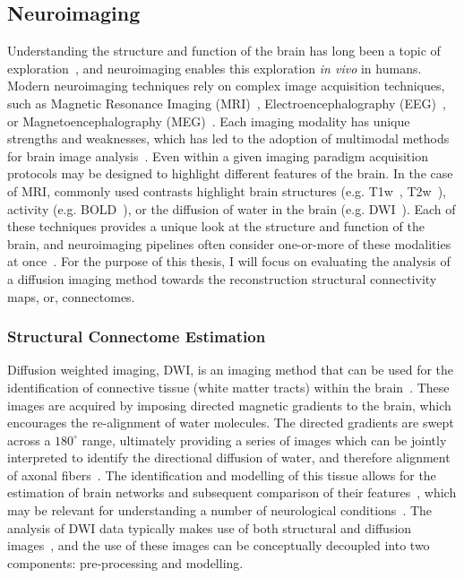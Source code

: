 \subsection{Neuroimaging}
Understanding the structure and function of the brain has long been a topic of exploration~\cite{raichle2006brain}, and
neuroimaging enables this exploration \textit{in vivo} in humans. Modern neuroimaging techniques rely on complex image
acquisition techniques, such as Magnetic Resonance Imaging (MRI)~\cite{young1987magnetic}, Electroencephalography
(EEG)~\cite{da2009eeg}, or Magnetoencephalography (MEG)~\cite{baillet2017magnetoencephalography}. Each imaging modality
has unique strengths and weaknesses, which has led to the adoption of multimodal methods for brain image
analysis~\cite{sui2012review,calhoun2006feature}. Even within a given imaging paradigm acquisition protocols may be
designed to highlight different features of the brain. In the case of MRI, commonly used contrasts highlight brain
structures (e.g. T1w~\cite{bergamino2014review}, T2w~\cite{chavhan2009principles}), activity (e.g.
BOLD~\cite{logothetis2004nature}), or the diffusion of water in the brain (e.g. DWI~\cite{bammer2003basic}). Each of
these techniques provides a unique look at the structure and function of the brain, and neuroimaging pipelines often
consider one-or-more of these modalities at once~\cite{esteban2019fmriprep,garyfallidis2014dipy}. For the purpose of
this thesis, I will focus on evaluating the analysis of a diffusion imaging method towards the reconstruction structural
connectivity maps, or, connectomes.

\subsubsection{Structural Connectome Estimation}

Diffusion weighted imaging, DWI, is an imaging method that can be used for the identification of connective tissue
(white matter tracts) within the brain~\cite{wandell2016clarifying,thomason2011diffusion}. These images are acquired by
imposing directed magnetic gradients to the brain, which encourages the re-alignment of water molecules. The directed
gradients are swept across a $180^{\circ}$ range, ultimately providing a series of images which can be jointly
interpreted to identify the directional diffusion of water, and therefore alignment of axonal
fibers~\cite{pinto2020harmonization}. The identification and modelling of this tissue allows for the estimation of
brain networks and subsequent comparison of their features~\cite{sporns2013human}, which may be relevant for
understanding a number of neurological
conditions~\cite{shah2017altered,yan2018rich,xie2012mapping,griffa2013structural}. The analysis of DWI data typically
makes use of both structural and diffusion images~\cite{jenkinson2012fsl,garyfallidis2014dipy}, and the use of these
images can be conceptually decoupled into two components: pre-processing and modelling.


